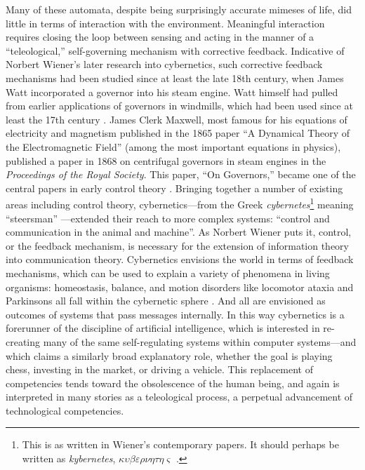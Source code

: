 Many of these automata, despite being surprisingly accurate
mimeses of life, did little in terms of interaction with the
environment. Meaningful interaction requires closing the loop between
sensing and acting in the manner of a
 ``teleological,'' self-governing mechanism with corrective feedback.
 Indicative of Norbert Wiener's later research into cybernetics, such
 corrective feedback mechanisms had been studied since at least the
 late 18th century, when James Watt incorporated a governor into his
 steam engine. Watt himself had pulled from earlier applications of
 governors in windmills, which had been used since at least the 17th
 century \cite{richardhills}. James Clerk Maxwell, most famous for his equations of
 electricity and magnetism published in the 1865 paper ``A Dynamical
 Theory of the Electromagnetic Field'' (among the most important
 equations in physics), published a paper in 1868 on centrifugal
 governors in steam engines in the \emph{Proceedings of the Royal Society}. This
 paper, ``On Governors,'' became one of the central papers in early
 control theory \cite{ottomayr}. Bringing together a number of existing
 areas including control theory,
 cybernetics---from the Greek \emph{cybernetes}\footnote{This is as
   written in Wiener's contemporary papers. It should perhaps be written
   as \emph{kybernetes},
   $\kappa\upsilon\beta\varepsilon\rho\nu$\'{$\eta$}$\tau\eta\varsigma$
   \cite[p. 11]{cybernetics}.} meaning 
 ``steersman'' \cite[p. 6]{wienerMainIdeas}---extended their reach to more complex
 systems: ``control and communication in the animal and machine''. As
 Norbert Wiener puts it, control, or the
 feedback mechanism, is necessary for the extension of information
 theory into communication theory. Cybernetics envisions the world in
 terms of feedback mechanisms, which can be used to explain a variety
 of phenomena in living organisms: homeostasis, balance, and motion
 disorders like locomotor ataxia and Parkinsons all fall within the
 cybernetic sphere \cite[p. 10-15]{wienerMainIdeas}. And all are envisioned
 as outcomes of systems that pass messages internally. In this way
 cybernetics is a forerunner of the discipline of
 artificial intelligence, which is interested in re-creating many of the same
 self-regulating systems within computer systems---and which claims a
 similarly broad explanatory role, whether the goal is playing chess,
 investing in the market, or driving a vehicle. This replacement of
 competencies tends toward the obsolescence of the human being, and
 again is interpreted in many stories as a teleological process, a
 perpetual advancement of technological competencies.

